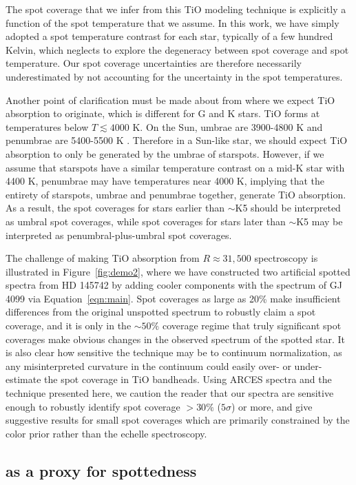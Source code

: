 The spot coverage that we infer from this TiO modeling technique is explicitly a function of the spot temperature that we assume. In this work, we have simply adopted a spot temperature contrast for each star, typically of a few hundred Kelvin, which neglects to explore the degeneracy between spot coverage and spot temperature. Our spot coverage uncertainties are therefore necessarily underestimated by not accounting for the uncertainty in the spot temperatures. 

Another point of clarification must be made about from where we expect TiO absorption to originate, which is different for G and K stars. TiO forms at temperatures below $T \lesssim 4000$ K. On the Sun, umbrae are 3900-4800 K and penumbrae are 5400-5500 K \citep{Solanki2003}. Therefore in a Sun-like star, we should expect TiO absorption to only be generated by the umbrae of starspots. However, if we assume that starspots have a similar temperature contrast on a mid-K star with 4400 K, penumbrae may have temperatures near 4000 K, implying that the entirety of starspots, umbrae and penumbrae together, generate TiO absorption. As a result, the spot coverages for stars earlier than $\sim$K5 should be interpreted as umbral spot coverages, while spot coverages for stars later than $\sim$K5 may be interpreted as penumbral-plus-umbral spot coverages. 

The challenge of making TiO absorption from $R\approx31,500$ spectroscopy is illustrated in Figure~\ref{fig:demo2}, where we have constructed two artificial spotted spectra from HD 145742 by adding cooler components with the spectrum of GJ 4099 via Equation~\ref{eqn:main}. Spot coverages as large as 20\% make insufficient differences from the original unspotted spectrum to robustly claim a spot coverage, and it is only in the $\sim 50\%$ coverage regime that truly significant spot coverages make obvious changes in the observed spectrum of the spotted star. It is also clear how sensitive the technique may be to continuum normalization, as any misinterpreted curvature in the continuum could easily over- or under-estimate the spot coverage in TiO bandheads. Using ARCES spectra and the technique presented here, we caution the reader that our spectra are sensitive enough to robustly identify spot coverage $>30\%$ ($5\sigma$) or more, and give suggestive results for small spot coverages which are primarily constrained by the \gaia color prior rather than the echelle spectroscopy. 

\subsection{\logrprime as a proxy for spottedness}

